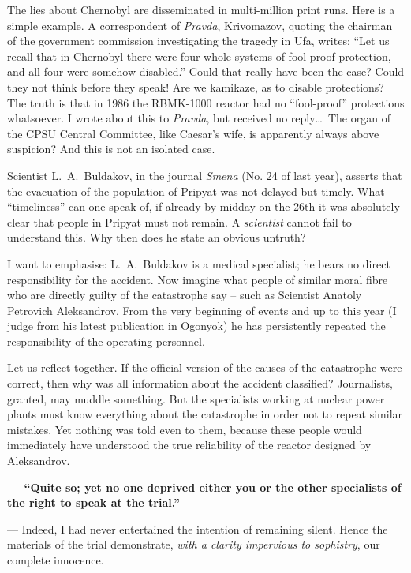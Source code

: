 \documentclass[openright]{bookest}
\begin{document}
The lies about Chernobyl are disseminated in multi-million print runs. Here is a simple example. A correspondent of \textit{Pravda}, Krivomazov, quoting the chairman of the government commission investigating the tragedy in Ufa, writes: ``Let us recall that in Chernobyl there were four whole systems of fool-proof protection, and all four were somehow disabled.'' Could that really have been the case? Could they not think before they speak! Are we kamikaze, as to disable protections? The truth is that in 1986 the RBMK-1000 reactor had no ``fool-proof'' protections whatsoever. I wrote about this to \textit{Pravda}, but received no reply\ldots~The organ of the CPSU Central Committee, like Caesar's wife, is apparently always above suspicion? And this is not an isolated case.

Scientist L.~A.~Buldakov, in the journal \textit{Smena} (No. 24 of last year), asserts that the evacuation of the population of Pripyat was not delayed but timely. What ``timeliness'' can one speak of, if already by midday on the 26th it was absolutely clear that people in Pripyat must not remain. A \textit{scientist} cannot fail to understand this. Why then does he state an obvious untruth?

I want to emphasise: L.~A.~Buldakov is a medical specialist; he bears no direct responsibility for the accident. Now imagine what people of similar moral fibre who are directly guilty of the catastrophe say -- such as Scientist Anatoly Petrovich Aleksandrov. From the very beginning of events and up to this year (I judge from his latest publication in Ogonyok) he has persistently repeated the responsibility of the operating personnel.

Let us reflect together. If the official version of the causes of the catastrophe were correct, then why was all information about the accident classified? Journalists, granted, may muddle something. But the specialists working at nuclear power plants must know everything about the catastrophe in order not to repeat similar mistakes. Yet nothing was told even to them, because these people would immediately have understood the true reliability of the reactor designed by Aleksandrov.

\medskip

\textbf{--- ``Quite so; yet no one deprived either you or the other specialists of the right to speak at the trial.''}

\noindent
--- Indeed, I had never entertained the intention of remaining silent. Hence the materials of the trial demonstrate, \emph{with a clarity impervious to sophistry}, our complete innocence.
\end{document}
